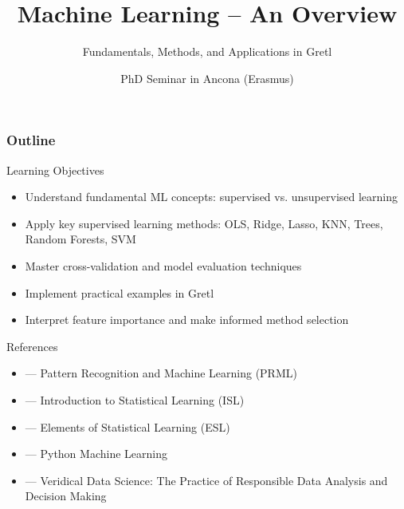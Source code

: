 \documentclass[11pt]{beamer}
\title{Machine Learning -- An Overview}
\subtitle{Fundamentals, Methods, and Applications in Gretl}
\date{PhD Seminar in Ancona (Erasmus)}
\begin{document}
\begin{frame}
	\titlepage
\end{frame}


\begin{frame}
	\frametitle{Outline}
	\tableofcontents
\end{frame}

\begin{frame}{Learning Objectives}
	\begin{itemize}
		\setlength{\itemsep}{0.25cm}
		\item Understand fundamental ML concepts: supervised vs. unsupervised learning
		\item Apply key supervised learning methods: OLS, Ridge, Lasso, KNN, Trees, Random Forests, SVM
		\item Master cross-validation and model evaluation techniques
		\item Implement practical examples in Gretl
		\item Interpret feature importance and make informed method selection
	\end{itemize}
\end{frame}


\begin{frame}{References}
	\begin{itemize}
		\small
		\setlength{\itemsep}{0.15cm}
		\item \citet{Bishop2016} --- Pattern Recognition and Machine Learning (PRML)
		\item \citet{james2023IntroductionStatisticalLearning} --- Introduction to Statistical Learning (ISL)
		\item \citet{hastieElementsStatisticalLearning2009} --- Elements of Statistical Learning (ESL)
		\item \citet{raschka2019PythonMachineLearning} --- Python Machine Learning
		\item \citet{yu2024VeridicalDataScience} --- Veridical Data Science: The Practice of Responsible Data Analysis and Decision Making
	\end{itemize}
\end{frame}
\end{document}

